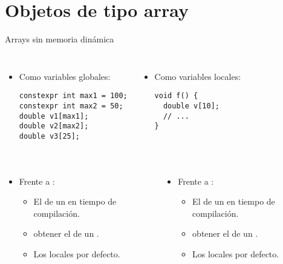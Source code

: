 \section{Objetos de tipo array}

\begin{frame}[t,fragile]{Arrays sin memoria dinámica}
\begin{columns}[T]
\begin{itemize}
  \item Como variables globales:
\begin{lstlisting}
constexpr int max1 = 100;
constexpr int max2 = 50;
double v1[max1];
double v2[max2];
double v3[25];
\end{lstlisting}
\end{itemize}

\begin{itemize}
  \item Como variables locales:
\begin{lstlisting}
void f() {
  double v[10];
  // ...
}
\end{lstlisting}
\end{itemize}

\end{columns}

\begin{columns}[T]


\begin{itemize}
  \item Frente a :
    \begin{itemize}
      \item El  de un   
            en tiempo de compilación.
      \item {} obtener el  de un 
            .
      \item Los  locales  por defecto.
    \end{itemize}
\end{itemize}


\begin{itemize}
  \item Frente a :
    \begin{itemize}
      \item El  de un  
            en tiempo de compilación.
      \item {} obtener el  de un 
            .
      \item Los  locales  por defecto.
    \end{itemize}
\end{itemize}


\end{columns}
\end{frame}
